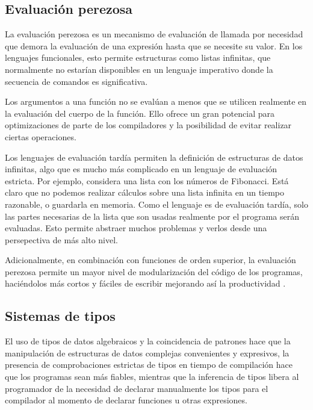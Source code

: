 \subsection{Evaluación perezosa}

La evaluación perezosa es un mecanismo de evaluación de llamada por necesidad que demora la evaluación de una expresión hasta que se necesite su valor. En los lenguajes funcionales, esto permite estructuras como listas infinitas, que normalmente no estarían disponibles en un lenguaje imperativo donde la secuencia de comandos es significativa.

Los argumentos a una función no se evalúan a menos que se utilicen realmente en la evaluación del cuerpo de la función. Ello ofrece un gran potencial para optimizaciones de parte de los compiladores y la posibilidad de evitar realizar ciertas operaciones.

Los lenguajes de evaluación tardía permiten la definición de estructuras de datos infinitas, algo que es mucho más complicado en un lenguaje de evaluación estricta. Por ejemplo, considera una lista con los números de Fibonacci. Está claro que no podemos realizar cálculos sobre una lista infinita en un tiempo razonable, o guardarla en memoria. Como el lenguaje es de evaluación tardía, solo las partes necesarias de la lista que son usadas realmente por el programa serán evaluadas. Esto permite abstraer muchos problemas y verlos desde una persepectiva de más alto nivel.

Adicionalmente, en combinación con funciones de orden superior, la evaluación perezosa permite un mayor nivel de modularización del código de los programas, haciéndolos más cortos y fáciles de escribir mejorando así la productividad \cite{hughes1989functional}.

\subsection{Sistemas de tipos}

El uso de tipos de datos algebraicos y la coincidencia de patrones hace que la manipulación de estructuras de datos complejas convenientes y expresivos, la presencia de comprobaciones estrictas de tipos en tiempo de compilación hace que los programas sean más fiables, mientras que la inferencia de tipos libera al programador de la necesidad de declarar manualmente los tipos para el compilador al momento de declarar funciones u otras expresiones.
